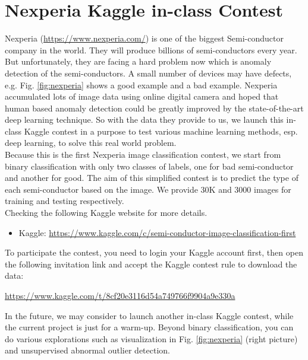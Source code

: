 \documentclass[11pt]{article}
\begin{document}
\section{Nexperia Kaggle in-class Contest}
Nexperia (\url{https://www.nexperia.com/}) is one of the biggest Semi-conductor company in the world. They will produce billions of semi-conductors every year. But unfortunately, they are facing a hard problem now which is anomaly detection of the semi-conductors. A small number of devices may have defects, e.g. Fig. \ref{fig:nexperia} shows a good example and a bad example. 
Nexperia accumulated lots of image data using online digital camera and hoped that human based anomaly detection could be greatly improved by the state-of-the-art deep learning technique. So with the data they provide to us, we launch this in-class Kaggle contest in a purpose to test various machine learning methods, esp. deep learning, to solve this real world problem.\\
Because this is the first Nexperia image classification contest, we start from binary classification with only two classes of labels, one for bad semi-conductor and another for good. The aim of this simplified contest is to predict the type of each semi-conductor based on the image. We provide 30K and 3000 images for training and testing respectively.\\

Checking the following Kaggle website for more details. 
\begin{itemize}
	\item Kaggle: \url{https://www.kaggle.com/c/semi-conductor-image-classification-first}
\end{itemize}
\noindent To participate the contest, you need to login your Kaggle account first, then open the following invitation link and accept the Kaggle contest rule to download the data: 

\begin{center}
\url{https://www.kaggle.com/t/8cf20e3116d54a749766f9904a9e330a}
\end{center}

\noindent In the future, we may consider to launch another in-class Kaggle contest, while the current project is just for a warm-up. Beyond binary classification, you can do various explorations such as visualization in Fig. \ref{fig:nexperia} (right picture) and unsupervised abnormal outlier detection.
\end{document}
